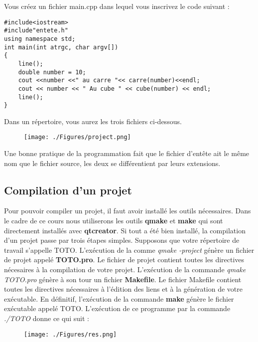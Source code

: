 \documentclass[a4paper, oneside,11pt]{book}
\begin{document}
Vous cr\'eez un fichier main.cpp dans lequel vous inscrivez le code suivant :

\begin{lstlisting}
#include<iostream>
#include"entete.h"
using namespace std;
int main(int atrgc, char argv[])
{
    line();
    double number = 10;
    cout <<number <<" au carre "<< carre(number)<<endl;
    cout << number << " Au cube " << cube(number) << endl;
    line();
}
\end{lstlisting}

Dans un r\'epertoire, vous aurez les trois fichiers ci-dessous.

\begin{figure}[hhhh]
\begin{center}
\texttt{[image: ./Figures/project.png]}
\end{center}
\end{figure}

Une bonne pratique de la programmation fait que le fichier d'ent\^ete ait le m\^eme nom que le fichier source, les deux se diff\'erentient par leurs extensions.

\subsection{Compilation d'un projet}

Pour pouvoir compiler un projet, il faut avoir install\'e les outils n\'ecessaires. Dans le cadre de ce cours nous utiliserons les outils \textbf{qmake} et \textbf{make}
qui sont directement install\'es avec \textbf{qtcreator}. Si tout a \'et\'e bien install\'e, la compilation d'un projet passe par trois \'etapes simples. 
Supposons que votre r\'epertoire de travail s'appelle TOTO. L'ex\'ecution de la comme \textit{qmake -project} g\'en\`ere un fichier de projet appel\'e \textbf{TOTO.pro}. Le
fichier de projet contient toutes les directives n\'ecesaires \`a la compilation de votre projet. L'ex\'ecution de la commande \textit{qmake TOTO.pro} g\'en\`ere \`a son 
tour un fichier \textbf{Makefile}. Le fichier Makefile contient toutes les directives n\'ecessaires \`a l'\'edition des liens et \`a la g\'en\'eration de votre ex\'ecutable.
En d\'efinitif, l'ex\'ecution de la commande \textbf{make} g\'en\`ere
le fichier ex\'ecutable appel\'e TOTO.
L'ex\'ecution de ce programme par la commande \textit{./TOTO} donne ce qui suit :
\begin{figure}[hhhh]
\begin{center}
\texttt{[image: ./Figures/res.png]}
\end{center}
\end{figure}
\end{document}
